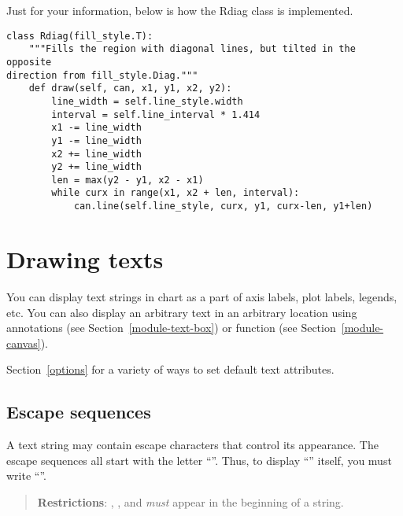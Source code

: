 \documentclass{howto}
\newcommand{\secref}[1]{Section~\ref{#1}}
\newcommand{\pxref}[1]{see Section~\ref{#1}}
\begin{document}
Just for your information, below is how the Rdiag class is implemented.

\begin{verbatim}
class Rdiag(fill_style.T):
    """Fills the region with diagonal lines, but tilted in the opposite
direction from fill_style.Diag."""
    def draw(self, can, x1, y1, x2, y2):
        line_width = self.line_style.width
        interval = self.line_interval * 1.414
        x1 -= line_width
        y1 -= line_width
        x2 += line_width
        y2 += line_width
        len = max(y2 - y1, x2 - x1)
        while curx in range(x1, x2 + len, interval):
            can.line(self.line_style, curx, y1, curx-len, y1+len)
\end{verbatim}

\section{Drawing texts}


You can display text strings in chart as a part of axis labels, plot
labels, legends, etc. You can also display an arbitrary text in an
arbitrary location using annotations (\pxref{module-text-box}) or
 function (\pxref{module-canvas}).

\begin{seealso}
  \secref{options} for a variety of ways to set default text attributes.
\end{seealso}

\subsection{Escape sequences}\label{escape-sequence}

A text string may contain escape characters that control its
appearance.  The escape sequences all start with the letter
``\code{/}''. Thus, to display ``\code{/}'' itself, you must write
``\code{//}''.

\begin{quote}
\textbf{Restrictions}: , , and  \emph{must}
appear in the beginning of a string.
\end{quote}

\index{/}

\end{document}

